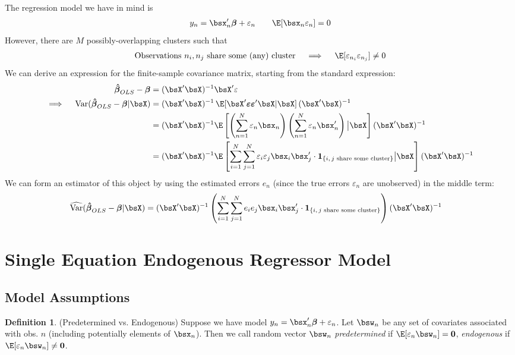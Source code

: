 \documentclass[12pt]{article}
\theoremstyle{plain}
\theoremstyle{definition}
\newtheorem{defn}[thm]{Definition}
\theoremstyle{remark}
\newcommand{\bsvarepsilon}{\boldsymbol{\varepsilon}}
\newcommand{\bsbeta}{\boldsymbol{\beta}}
\newcommand{\bshatbeta}{\boldsymbol{\hat{\beta}}}
\renewcommand{\bso}{\boldsymbol{0}}
\newcommand{\Var}{\operatorname{Var}}
\newcommand{\sumnN}{\sum^N_{n=1}}
\newcommand{\sumiN}{\sum^N_{i=1}}
\begin{document}
The regression model we have in mind is
\begin{align*}
  y_n = \bsx_n'\bsbeta + \varepsilon_n
  \qquad \E[\bsx_n\varepsilon_n] = 0
\end{align*}
However, there are $M$ possibly-overlapping clusters such that
\begin{align*}
  \text{Observations $n_i,n_j$ share some (any) cluster}
  \quad\implies\quad
  \E[\varepsilon_{n_i}\varepsilon_{n_j}] \neq 0
\end{align*}
We can derive an expression for the finite-sample covariance matrix,
starting from the standard expression:
\begin{align*}
  \bshatbeta_{OLS} - \bsbeta
  &= (\bsX'\bsX)^{-1}\bsX'\varepsilon
  \\
  \implies\quad
  \Var(\bshatbeta_{OLS} - \bsbeta|\bsX)
  &=
  (\bsX'\bsX)^{-1}
  \,
  \E[\bsX'\bsvarepsilon\bsvarepsilon'\bsX|\bsX]
  \,
  (\bsX'\bsX)^{-1} \\
  &=
  (\bsX'\bsX)^{-1}
  \E\left[
  \left(
    \sumnN \varepsilon_n\bsx_n
  \right)
  \left(
    \sumnN \varepsilon_n\bsx_n'
  \right)
  \big|\bsX
  \right]
  (\bsX'\bsX)^{-1}
  \\
  &=
  (\bsX'\bsX)^{-1}
  \E\left[
  \sumiN
  \sum_{j=1}^N
  \varepsilon_i\varepsilon_j\bsx_i\bsx_j'
  \cdot
  \mathbf{1}_{\{\text{$i,j$ share some cluster}\}}
  \big| \bsX
  \right]
  (\bsX'\bsX)^{-1}
\end{align*}
We can form an estimator of this object by using the estimated errors
$e_n$ (since the true errors $\varepsilon_n$ are unobserved) in the
middle term:
\begin{align*}
  \widehat{\Var}(\bshatbeta_{OLS} - \bsbeta|\bsX)
  &=
  (\bsX'\bsX)^{-1}
  \left(
  \sumiN
  \sum_{j=1}^N
  e_ie_j\bsx_i\bsx_j'
  \cdot
  \mathbf{1}_{\{\text{$i,j$ share some cluster}\}}
  \right)
  (\bsX'\bsX)^{-1}
\end{align*}


\clearpage
\section{Single Equation Endogenous Regressor Model}

\subsection{Model Assumptions}

\begin{defn}(Predetermined vs. Endogenous)
Suppose we have model $y_n = \bsx_n'\bsbeta + \varepsilon_n$.
Let $\bsw_n$ be any set of covariates associated with obs.
$n$ (including potentially elements of $\bsx_n$).
Then we call random vector $\bsw_n$ \emph{predetermined} if
$\E[\varepsilon_n\bsw_n]=\bso$, \emph{endogenous} if
$\E[\varepsilon_n\bsw_n]\neq \bso$.
\end{defn}
\end{document}

